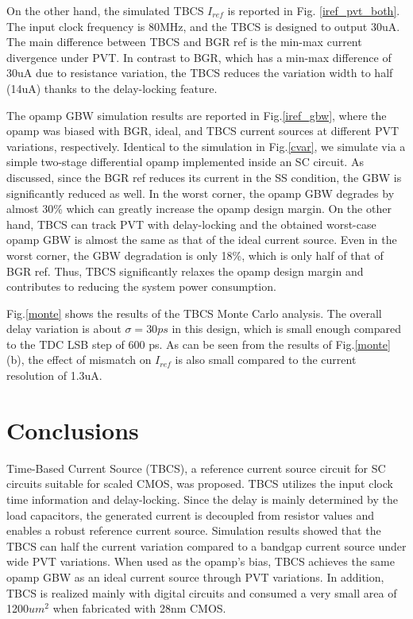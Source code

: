 \documentclass[paper]{ieice}
\begin{document}
On the other hand, the simulated TBCS $I_{ref}$ is reported in Fig. \ref{iref_pvt_both}. The input clock frequency is 80MHz, and the TBCS is designed to output 30uA. The main difference between TBCS and BGR ref is the min-max current divergence under PVT. In contrast to BGR, which has a min-max difference of 30uA due to resistance variation, the TBCS reduces the variation width to half (14uA) thanks to the delay-locking feature.

The opamp GBW simulation results are reported in Fig.\ref{iref_gbw}, where the opamp was biased with BGR, ideal, and TBCS current sources at different PVT variations, respectively. Identical to the simulation in Fig.\ref{cvar}, we simulate via a simple two-stage differential opamp implemented inside an SC circuit.
As discussed, since the BGR ref reduces its current in the SS condition, the GBW is significantly reduced as well. In the worst corner, the opamp GBW degrades by almost 30\% which can greatly increase the opamp design margin.
On the other hand, TBCS can track PVT with delay-locking and the obtained worst-case opamp GBW is almost the same as that of the ideal current source. Even in the worst corner, the GBW degradation is only 18\%, which is only half of that of BGR ref. Thus, TBCS significantly relaxes the opamp design margin and contributes to reducing the system power consumption.

Fig.\ref{monte} shows the results of the TBCS Monte Carlo analysis. The overall delay variation is about $\sigma= 30 ps$ in this design, which is small enough compared to the TDC LSB step of 600 ps. As can be seen from the results of Fig.\ref{monte}(b), the effect of mismatch on $I_{ref}$ is also small compared to the current resolution of 1.3uA. %


\section{Conclusions}
Time-Based Current Source (TBCS), a reference current source circuit for SC circuits suitable for scaled CMOS, was proposed. TBCS utilizes the input clock time information and delay-locking. Since the delay is mainly determined by the load capacitors, the generated current is decoupled from resistor values and enables a robust reference current source.  Simulation results showed that the TBCS can half the current variation compared to a bandgap current source under wide PVT variations. When used as the opamp's bias, TBCS achieves the same opamp GBW as an ideal current source through PVT variations. In addition, TBCS is realized mainly with digital circuits and consumed a very small area of 1200$um^2$ when fabricated with 28nm CMOS.
\end{document}
